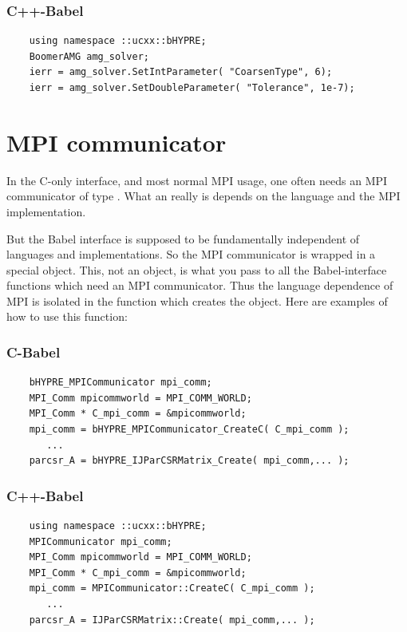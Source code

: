 \subsubsection{C++-Babel}
\begin{verbatim}
    using namespace ::ucxx::bHYPRE;
    BoomerAMG amg_solver;
    ierr = amg_solver.SetIntParameter( "CoarsenType", 6);
    ierr = amg_solver.SetDoubleParameter( "Tolerance", 1e-7);
\end{verbatim}

\section{MPI communicator}

In the C-only \hypre{} interface, and most normal MPI usage, one often
needs an MPI communicator of type .  What an
 really is depends on the language and the MPI
implementation.

But the Babel interface is supposed to be fundamentally independent of
languages and implementations.  So the MPI communicator is wrapped in
a special  object.  This, not an
 object, is what you pass to all the Babel-interface
functions which need an MPI communicator.  Thus the language
dependence of MPI is isolated in the function which creates the
 object.  Here are examples of how to use
this function:

\subsubsection{C-Babel}
\begin{verbatim}
    bHYPRE_MPICommunicator mpi_comm;
    MPI_Comm mpicommworld = MPI_COMM_WORLD;
    MPI_Comm * C_mpi_comm = &mpicommworld;
    mpi_comm = bHYPRE_MPICommunicator_CreateC( C_mpi_comm );
       ...
    parcsr_A = bHYPRE_IJParCSRMatrix_Create( mpi_comm,... );
\end{verbatim}

\subsubsection{C++-Babel}
\begin{verbatim}
    using namespace ::ucxx::bHYPRE;
    MPICommunicator mpi_comm;
    MPI_Comm mpicommworld = MPI_COMM_WORLD;
    MPI_Comm * C_mpi_comm = &mpicommworld;
    mpi_comm = MPICommunicator::CreateC( C_mpi_comm );
       ...
    parcsr_A = IJParCSRMatrix::Create( mpi_comm,... );
\end{verbatim}


